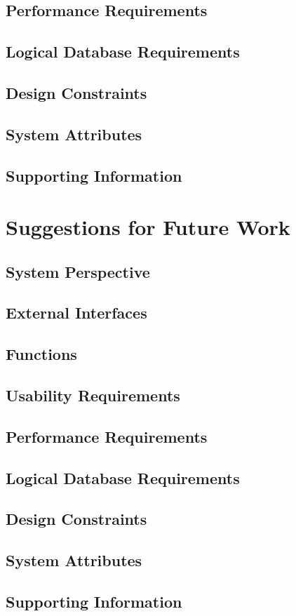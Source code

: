 \documentclass[a4paper]{article}
\begin{document}
        \subsection{Performance Requirements}

        \subsection{Logical Database Requirements}

        \subsection{Design Constraints}

        \subsection{System Attributes}

        \subsection{Supporting Information}

    \section{Suggestions for Future Work}

        \subsection{System Perspective}

        \subsection{External Interfaces}

        \subsection{Functions}

        \subsection{Usability Requirements}

        \subsection{Performance Requirements}

        \subsection{Logical Database Requirements}

        \subsection{Design Constraints}

        \subsection{System Attributes}

        \subsection{Supporting Information}
\end{document}
